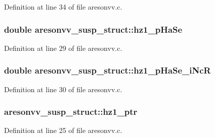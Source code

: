 Definition at line 34 of file aresonvv.\+c.

\subsubsection[{\texorpdfstring{hz1\+\_\+p\+Ha\+Se}{hz1_pHaSe}}]{\setlength{\rightskip}{0pt plus 5cm}double aresonvv\+\_\+susp\+\_\+struct\+::hz1\+\_\+p\+Ha\+Se}\hypertarget{structaresonvv__susp__struct_a3cd10d6e665bfd3c4ff8ef9eb6add932}{}\label{structaresonvv__susp__struct_a3cd10d6e665bfd3c4ff8ef9eb6add932}


Definition at line 29 of file aresonvv.\+c.

\subsubsection[{\texorpdfstring{hz1\+\_\+p\+Ha\+Se\+\_\+i\+NcR}{hz1_pHaSe_iNcR}}]{\setlength{\rightskip}{0pt plus 5cm}double aresonvv\+\_\+susp\+\_\+struct\+::hz1\+\_\+p\+Ha\+Se\+\_\+i\+NcR}\hypertarget{structaresonvv__susp__struct_a75d5e45675589c23ae429a01595ec1ba}{}\label{structaresonvv__susp__struct_a75d5e45675589c23ae429a01595ec1ba}


Definition at line 30 of file aresonvv.\+c.

\subsubsection[{\texorpdfstring{hz1\+\_\+ptr}{hz1_ptr}}]{ aresonvv\+\_\+susp\+\_\+struct\+::hz1\+\_\+ptr}\hypertarget{structaresonvv__susp__struct_afd7be08dd6faeae4631eee0d40bc25d0}{}\label{structaresonvv__susp__struct_afd7be08dd6faeae4631eee0d40bc25d0}


Definition at line 25 of file aresonvv.\+c.


